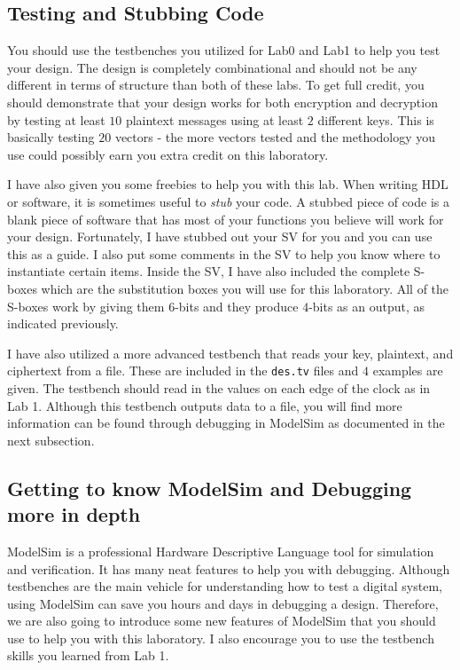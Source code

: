 \documentclass{article}
\begin{document}
\subsection{Testing and Stubbing Code}

You should use the testbenches you utilized for Lab0 and Lab1 to help
you test your design.  The design is completely combinational and
should not be any different in terms of structure than both of these
labs.  To get full credit, you should demonstrate that your design
works for both encryption and decryption by testing at least $10$
plaintext messages using at least $2$ different keys.  This is
basically testing $20$ vectors - the more vectors tested and the
methodology you use could possibly
earn you extra credit on this laboratory.

I have also given you some freebies to help you with this lab.  When
writing HDL or software, it is sometimes useful to \textit{stub} your
code.  A stubbed piece of code is a blank piece of software that has
most of your functions you believe will work for your design.
Fortunately, I have stubbed out your SV for you and you can use this
as a guide.  I also put some comments in the SV to help you know where
to instantiate certain items.
Inside the SV, I have also included the complete S-boxes
which are the substitution boxes you will use for
this laboratory.  All of the S-boxes work by giving them $6$-bits and
they produce $4$-bits as an output, as indicated previously.

I have also utilized a more advanced testbench that reads your
key, plaintext, and ciphertext from a file.  These are included in the
\verb!des.tv! files and $4$ examples are given.  The testbench should
read in the values on each edge of the clock as in Lab 1.  Although
this testbench outputs data to a file, you will find more information
can be found through debugging in ModelSim as documented in the next
subsection.

\subsection{Getting to know ModelSim and Debugging more in depth}

ModelSim is a professional Hardware Descriptive Language tool for
simulation and verification.  It has many neat features to help you
with debugging.  Although testbenches are the main vehicle for
understanding how to test a digital system, using ModelSim can save
you hours and days in debugging a design.  Therefore, we are also
going to introduce some new features of ModelSim that you should use
to help you with this laboratory. I also encourage you to use the
testbench skills you learned from Lab 1.
\end{document}
